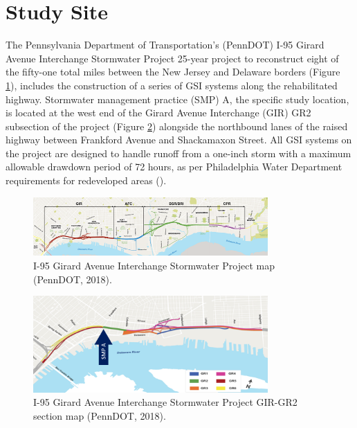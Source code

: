 \section{Study Site}

The Pennsylvania Department of Transportation's (PennDOT) I-95 Girard Avenue Interchange Stormwater Project 25-year project to reconstruct eight of the fifty-one total miles between the New Jersey and Delaware borders (Figure \ref{fig:revive-full-map}), includes the construction of a series of GSI systems along the rehabilitated highway.
Stormwater management practice (SMP) A, the specific study location, is located at the west end of the Girard Avenue Interchange (GIR) GR2 subsection of the project (Figure \ref{fig:GR2-map}) alongside the northbound lanes of the raised highway between Frankford Avenue and Shackamaxon Street.
All GSI systems on the project are designed to handle runoff from a one-inch storm with a maximum allowable drawdown period of 72 hours, as per Philadelphia Water Department requirements for redeveloped areas (\cite{PhiladelphiaWaterDepartment2021}).

\begin{figure}[ht]
	\centering
	\includegraphics[width=0.8\textwidth]{gfx/chapter-introduction/i95revive_map.png}
	\caption[I-95 Girard Avenue Interchange Stormwater Project.]{I-95 Girard Avenue Interchange Stormwater Project map (PennDOT, 2018).}
	\label{fig:revive-full-map}
\end{figure}

\begin{figure}[ht]
	\centering
	\includegraphics[width=0.8\textwidth]{gfx/chapter-introduction/gr2_map.png}
	\caption[I-95 Girard Avenue Interchange Stormwater Project GIR-GR2 Section.]{I-95 Girard Avenue Interchange Stormwater Project GIR-GR2 section map (PennDOT, 2018).}
	\label{fig:GR2-map}
\end{figure}

